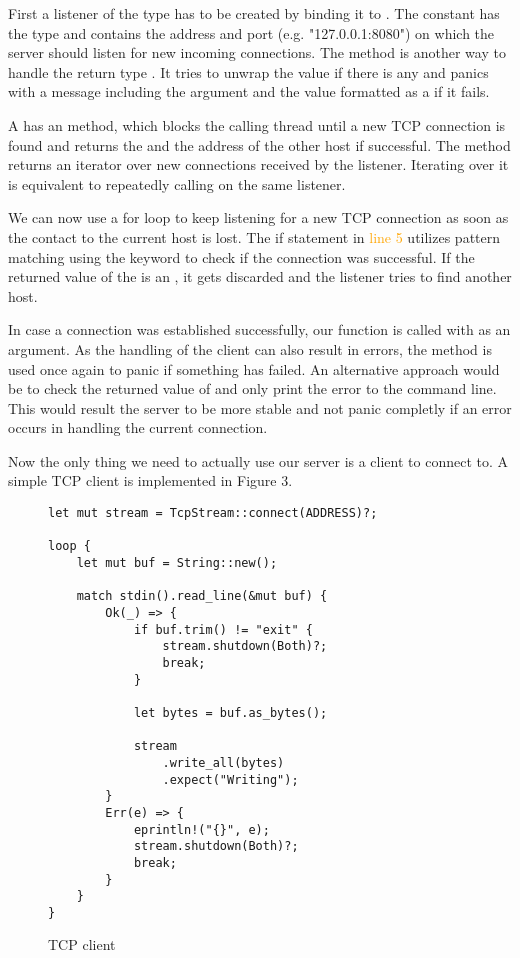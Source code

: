 First a listener of the type  has to be created by binding it to . The
constant  has the type  and contains the address and port (e.g. "127.0.0.1:8080") on which the
server should listen for new incoming connections. The method  is another way to handle the return type
. It tries to unwrap the  value if there is any and panics with a message including the argument
and the  value formatted as a  if it fails.

A  has an  method, which blocks the calling thread until a new TCP connection is found
and returns the  and the address of the other host if successful. The method  returns an
iterator over new connections received by the listener. Iterating over it is equivalent to repeatedly calling
 on the same listener.

We can now use a for loop to keep listening for a new TCP connection as soon as the contact to the current host is
lost. The if statement in \textcolor{orange}{line 5} utilizes pattern matching using the keyword  to check
if the connection was successful. If the returned value of the  is an , it gets discarded
and the listener tries to find another host.

In case a connection was established successfully, our function  is called with  as an
argument. As the handling of the client can also result in errors, the  method is used once again to
panic if something has failed. An alternative approach would be to check the returned value of  and
only print the error to the command line. This would result the server to be more stable and not panic completly if an
error occurs in handling the current connection.

Now the only thing we need to actually use our server is a client to connect to. A simple TCP client is implemented in
Figure 3.

\begin{figure}[ht]
    \begin{verbatim}
let mut stream = TcpStream::connect(ADDRESS)?;

loop {
    let mut buf = String::new();

    match stdin().read_line(&mut buf) {
        Ok(_) => {
            if buf.trim() != "exit" {
                stream.shutdown(Both)?;
                break;
            }

            let bytes = buf.as_bytes();

            stream
                .write_all(bytes)
                .expect("Writing");
        }
        Err(e) => {
            eprintln!("{}", e);
            stream.shutdown(Both)?;
            break;
        }
    }
}
    \end{verbatim}
    \caption{TCP client}
\end{figure}

